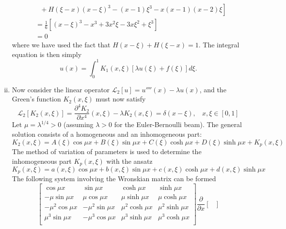 \begin{enumerate}[(i)]
{\begin{equation}
\begin{aligned}
        &~~~ + \left. H(\xi - x){(x-\xi)}^3 - (x-1)\xi^3 - x(x-1)(x-2)\xi \right] \\
        &= \frac{1}{6}\left[ {(x-\xi)}^3 - x^3 + 3x^2\xi - 3x\xi^2 + \xi^3\right] \\
        &= 0
    \end{aligned}
    \end{equation}
    where we have used the fact that $H(x - \xi) + H(\xi - x) = 1$.
    The integral equation is then simply 
    \begin{equation}
        u(x) = \int_0^1 K_1(x, \xi)[\lambda u(\xi) + f(\xi)] d\xi.
    \end{equation}
}
\item { %
    Now consider the linear operator $\mathcal{L}_2[u] = u''''(x) - \lambda u(x)$, and the Green's function $K_2(x, \xi)$ must now satisfy
    \begin{equation}
        \mathcal{L}_2[K_2(x, \xi)] = \frac{\partial^4 K_2}{\partial x^4}(x, \xi) - \lambda K_2(x, \xi) = \delta(x - \xi), ~~~~ x, \xi \in [0, 1]
    \end{equation}
    Let $\mu = \lambda^{1/4} > 0$ (assuming $\lambda > 0$ for the Euler-Bernoulli beam). 
    The general solution consists of a homogeneous and an inhomogeneous part:
    \begin{equation}
        K_2(x, \xi) = A(\xi)\cos\mu x + B(\xi)\sin\mu x + C(\xi)\cosh\mu x + D(\xi)\sinh\mu x + K_p(x, \xi)
    \end{equation}
    The method of variation of parameters is used to determine the inhomogeneous part $K_p(x, \xi)$ with the ansatz 
    \begin{equation}
        K_p(x, \xi) = a(x, \xi)\cos\mu x + b(x, \xi)\sin\mu x + c(x, \xi)\cosh\mu x + d(x, \xi)\sinh\mu x
    \end{equation}
    The following system involving the Wronskian matrix can be formed 
    \begin{equation}
        \begin{bmatrix}
            \cos\mu x & \sin\mu x  & \cosh\mu x & \sinh\mu x \\
            -\mu\sin\mu x & \mu\cos\mu x  & \mu\sinh\mu x & \mu\cosh\mu x \\
            -\mu^2\cos\mu x & -\mu^2\sin\mu x  & \mu^2\cosh\mu x & \mu^2\sinh\mu x \\
            \mu^3\sin\mu x & -\mu^3\cos\mu x  & \mu^3\sinh\mu x & \mu^3\cosh\mu x \\
        \end{bmatrix} \frac{\partial}{\partial x} \begin{bmatrix}

\end{bmatrix}
\end{equation}}
\end{enumerate}
